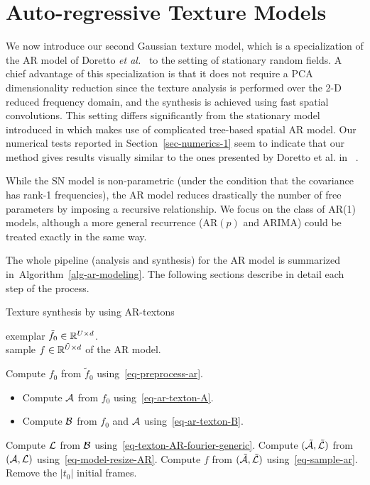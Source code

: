 \section{Auto-regressive Texture Models}
\label{sec-ar}

We now introduce our second Gaussian texture model, which is a specialization of the AR model of Doretto \emph{et al.}~\cite{doretto-ijcv} to the setting of stationary random fields. A chief advantage of this specialization is that it does not require a PCA dimensionality reduction since the texture analysis is performed over the 2-D reduced frequency domain, and the synthesis is achieved using fast spatial convolutions. This setting differs significantly from the stationary model introduced in \cite{Doretto04spatiallyhomogeneous} which makes use of complicated tree-based spatial AR model. Our numerical tests reported in Section~\ref{sec-numerics-1} seem to indicate that our method gives results visually similar to the ones presented by Doretto et al. in ~\cite{Doretto04spatiallyhomogeneous}.

While the SN model is non-parametric (under the condition that the covariance has rank-1 frequencies), the AR model reduces drastically the number of free parameters by imposing a recursive relationship. We focus on the class of AR(1) models, although a more general recurrence (AR$(p)$ and ARIMA) could be treated exactly in the same way.


The whole pipeline (analysis and synthesis) for the AR model is summarized in~Algorithm~\ref{alg-ar-modeling}. The following sections describe in detail each step of the process.


\begin{algorithm} %
\caption{Texture synthesis by using AR-textons}
\label{alg-ar-modeling}
\Require exemplar $\tilde f_0 \in \mathbb{R}^{U \times d}$. \\
\Ensure sample $f \in \mathbb{R}^{\tilde U \times d}$ of the AR model.
\begin{enumerate}
	 Compute $f_0$ from $\tilde f_0$ using~\eqref{eq-preprocess-ar}.
		\begin{itemize}
			\item Compute $\mathcal{A}$ from $f_0$ using~\eqref{eq-ar-texton-A}.
			\item Compute $\mathcal{B}$ from $f_0$ and $\mathcal{A}$ using~\eqref{eq-ar-texton-B}.
		\end{itemize}
	 Compute $\mathcal{L}$ from $\mathcal{B}$ using~\eqref{eq-texton-AR-fourier-generic}.
	 Compute $(\tilde {\mathcal{A}},\tilde {\mathcal{L}})$ from $(\mathcal{A},\mathcal{L})$ using~\eqref{eq-model-resize-AR}.
	 Compute $f$ from $(\tilde {\mathcal{A}},\tilde {\mathcal{L}})$ using~\eqref{eq-sample-ar}. \\ Remove the $|t_0|$ initial frames.
\end{enumerate}
\end{algorithm}


